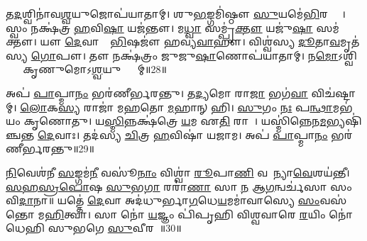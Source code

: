 𑌤\ul{𑌦}𑌶𑍍𑌵𑌿𑌨𑌾॑𑌵\ul{𑌶𑍍𑌵}𑌯𑍁𑌜𑍋𑌪॑𑌯𑌾𑌤𑌾𑌮𑍍।
𑌶𑍁\ul{𑌭}𑌙𑍍𑌗𑌮𑌿॑𑌷𑍍𑌠𑍗 \ul{𑌸𑍁}𑌯𑌮𑍇॑\ul{𑌭𑌿}𑌰𑌶𑍍𑌵𑍈𑌃᳚।
𑌸𑍍𑌵𑌂 𑌨𑌕𑍍𑌷॑𑌤𑍍𑌰 \ul{𑌹}𑌵𑌿\ul{𑌷𑌾} 𑌯𑌜॑𑌨𑍍𑌤𑍗।
𑌮\ul{𑌧𑍍𑌵𑌾} 𑌸𑌮𑍍𑌪𑍃॑\ul{𑌕𑍍𑌤𑍗} 𑌯𑌜𑍁॑\ul{𑌷𑌾} 𑌸𑌮॑𑌕𑍍𑌤𑍗।
𑌯𑍗 \ul{𑌦𑍇}𑌵𑌾𑌨𑌾𑌂᳚ \ul{𑌭𑌿}𑌷𑌜𑍗॑ 𑌹𑌵𑍍𑌯\ul{𑌵𑌾}𑌹𑍗।
𑌵𑌿𑌶𑍍𑌵॑𑌸𑍍𑌯 \ul{𑌦𑍂}𑌤𑌾\ul{𑌵}𑌮𑍃𑌤॑𑌸𑍍𑌯 \ul{𑌗𑍋}𑌪𑍗।
𑌤𑍗 𑌨𑌕𑍍𑌷॑𑌤𑍍𑌰𑌂 𑌜𑍁𑌜𑍁\ul{𑌷𑌾}𑌣𑍋𑌪॑𑌯𑌾𑌤𑌾𑌮𑍍।
𑌨\ul{𑌮𑍋}𑌽𑌶𑍍𑌵𑌿𑌭𑍍𑌯𑌾𑌂᳚ 𑌕𑍃𑌣𑍁𑌮𑍋𑌽\ul{𑌶𑍍𑌵}𑌯𑍁𑌗𑍍𑌭𑍍𑌯𑌾᳚𑌮𑍍॥28॥ 

𑌅𑌪॑ \ul{𑌪𑌾}𑌪𑍍𑌮𑌾\ul{𑌨𑌂} 𑌭𑌰॑𑌣𑍀𑌰𑍍𑌭𑌰𑌨𑍍𑌤𑍁।
𑌤\ul{𑌦𑍍𑌯}𑌮𑍋 𑌰𑌾\ul{𑌜𑌾} 𑌭𑌗॑\ul{𑌵𑌾}\an{} 𑌵𑌿𑌚॑𑌷𑍍𑌟𑌾𑌮𑍍।
\ul{𑌲𑍋}𑌕\ul{𑌸𑍍𑌯} 𑌰𑌾𑌜𑌾॑ 𑌮\ul{𑌹}𑌤𑍋 \ul{𑌮}𑌹𑌾𑌨𑍍 𑌹𑌿।
\ul{𑌸𑍁}𑌗𑌂 \ul{𑌨𑌃} 𑌪\ul{𑌨𑍍𑌥𑌾}𑌮𑌭॑𑌯𑌂 𑌕𑍃𑌣𑍋𑌤𑍁।
𑌯\ul{𑌸𑍍𑌮𑌿}𑌨𑍍𑌨𑌕𑍍𑌷॑𑌤𑍍𑌰𑍇 \ul{𑌯}𑌮 𑌏\ul{𑌤𑌿} 𑌰𑌾𑌜𑌾᳚।
𑌯𑌸𑍍𑌮𑌿॑𑌨𑍍𑌨𑍇𑌨\ul{𑌮}𑌭𑍍𑌯𑌷𑌿॑𑌞𑍍𑌚𑌨𑍍𑌤 \ul{𑌦𑍇}𑌵𑌾𑌃।
𑌤𑌦॑𑌸𑍍𑌯 \ul{𑌚𑌿}𑌤𑍍𑌰 \ul{𑌹}𑌵𑌿𑌷𑌾॑ 𑌯𑌜𑌾𑌮।
𑌅𑌪॑ \ul{𑌪𑌾}𑌪𑍍𑌮𑌾\ul{𑌨𑌂} 𑌭𑌰॑𑌣𑍀𑌰𑍍𑌭𑌰𑌨𑍍𑌤𑍁॥29॥ 

\ul{𑌨𑌿}𑌵𑍇𑌶॑𑌨𑍀 \ul{𑌸}𑌙𑍍𑌗𑌮॑\ul{𑌨𑍀} 𑌵𑌸𑍂॑\ul{𑌨𑌾𑌂} 𑌵𑌿𑌶𑍍𑌵𑌾॑ \ul{𑌰𑍂}𑌪𑌾\ul{𑌣𑌿} 𑌵𑌸𑍂᳚𑌨𑍍𑌯𑌾\ul{𑌵𑍇}𑌶𑌯॑𑌨𑍍𑌤𑍀।
\ul{𑌸}\ul{𑌹}\ul{𑌸𑍍𑌰}\ul{𑌪𑍋}𑌷 \ul{𑌸𑍁}𑌭\ul{𑌗𑌾} 𑌰𑌰𑌾॑\ul{𑌣𑌾} 𑌸𑌾 \ul{𑌨} 𑌆\ul{𑌗}𑌨𑍍𑌵𑌰𑍍𑌚॑𑌸𑌾 𑌸𑌂𑌵𑌿\ul{𑌦𑌾}𑌨𑌾॥ 𑌯𑌤𑍍𑌤𑍇॑ \ul{𑌦𑍇}𑌵𑌾 𑌅𑌦॑𑌧𑍁𑌰𑍍𑌭𑌾\ul{𑌗}𑌧𑍇\ul{𑌯}𑌮𑌮𑌾॑𑌵𑌾𑌸𑍍𑌯𑍇 \ul{𑌸𑌂}𑌵𑌸॑𑌨𑍍𑌤𑍋 𑌮\ul{𑌹𑌿}𑌤𑍍𑌵𑌾।
𑌸𑌾 𑌨𑍋॑ \ul{𑌯}𑌜𑍍𑌞𑌂 𑌪𑌿॑𑌪𑍃𑌹𑌿 𑌵𑌿𑌶𑍍𑌵𑌵𑌾𑌰𑍇 \ul{𑌰}𑌯𑌿𑌂 𑌨𑍋॑ 𑌧𑍇𑌹𑌿 𑌸𑍁𑌭𑌗𑍇 \ul{𑌸𑍁}𑌵𑍀𑌰𑌮𑍍᳚॥30॥ 

